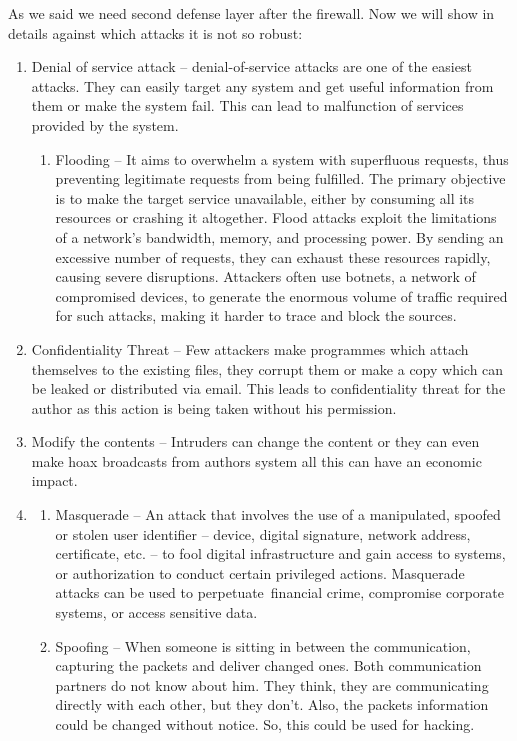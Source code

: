 \documentclass[oneside, english]{reports/assets/sdqtechreport}
\begin{document}
As we said we need second defense layer after the firewall. Now we will show in details against which attacks it is not so robust:
\begin{enumerate}
    \item Denial of service attack – denial-of-service attacks are one of the easiest attacks. They can easily target any system and get useful information from them or make the system fail. This can lead to malfunction of services provided by the system. 
	\begin{enumerate}
        \item Flooding – It aims to overwhelm a system with superfluous requests, thus preventing legitimate requests from being fulfilled. The primary objective is to make the target service unavailable, either by consuming all its resources or crashing it altogether. Flood attacks exploit the limitations of a network’s bandwidth, memory, and processing power. By sending an excessive number of requests, they can exhaust these resources rapidly, causing severe disruptions. Attackers often use botnets, a network of compromised devices, to generate the enormous volume of traffic required for such attacks, making it harder to trace and block the sources.
	\end{enumerate}
    \item Confidentiality Threat – Few attackers make programmes which attach themselves to the existing files, they corrupt them or make a copy which can be leaked or distributed via email. This leads to confidentiality threat for the author as this action is being taken without his permission. 
    \item Modify the contents – Intruders can change the content or they can even make hoax broadcasts from authors system all this can have an economic impact. 
    \item
	\begin{enumerate}
		\item Masquerade – An attack that involves the use of a manipulated, spoofed or stolen user identifier – device, digital signature, network address, certificate, etc. – to fool digital infrastructure and gain access to systems, or authorization to conduct certain privileged actions. Masquerade attacks can be used to perpetuate financial crime, compromise corporate systems, or access sensitive data.
		\item Spoofing – When someone is sitting in between the communication, capturing the packets and deliver changed ones. Both communication partners do not know about him. They think, they are communicating directly with each other, but they don't. Also, the packets information could be changed without notice. So, this could be used for hacking.

\end{enumerate}
\end{enumerate}
\end{document}
